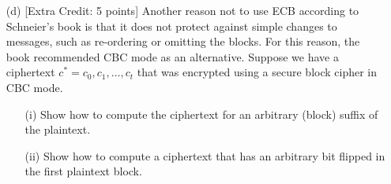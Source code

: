 \documentclass[11pt]{article}
\begin{document}
\begin{itemize}
\item[(d)] [Extra Credit: 5 points] Another reason not to use ECB
  according to Schneier's book is that it does not protect against
  simple changes to messages, such as re-ordering or omitting the
  blocks.  For this reason, the book recommended CBC mode as an
  alternative.  Suppose we have a ciphertext $c^* = c_0,c_1,\dots,c_t$ that
  was encrypted using a secure block cipher in CBC mode.
  \begin{itemize}
  \item[(i)] Show how to compute the ciphertext for an arbitrary
    (block) suffix of the plaintext.
  \item[(ii)] Show how to compute a ciphertext that has an
    arbitrary bit flipped in the first plaintext block.
  \end{itemize}  
\end{itemize}
\end{document}
